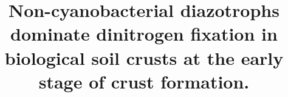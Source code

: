 \onecolumn
{}

\title[Non-cyanobacterial soil crust diazotrophs]{Non-cyanobacterial diazotrophs dominate dinitrogen fixation in biological soil crusts at the early stage of crust formation.}
\author[\firstAuthorLast]{\Authors}
\address{}
\correspondance{}
\extraAuth{}%
\topic{}%

\maketitle



